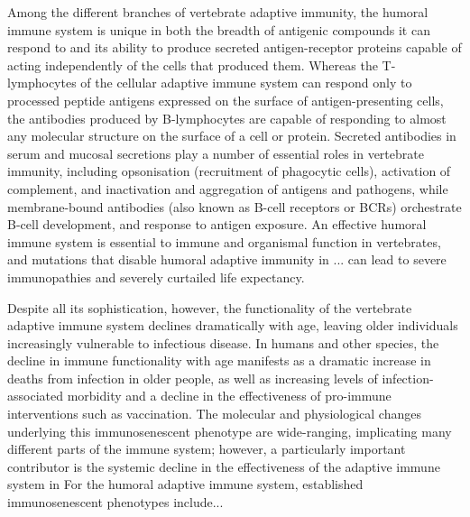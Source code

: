 Among the different branches of vertebrate adaptive immunity, the humoral immune system is unique in both the breadth of antigenic compounds it can respond to and its ability to produce secreted antigen-receptor proteins capable of acting independently of the cells that produced them. Whereas the T-lymphocytes of the cellular adaptive immune system can respond only to processed peptide antigens expressed on the surface of antigen-presenting cells, the antibodies produced by B-lymphocytes are capable of responding to almost any molecular structure on the surface of a cell or protein. Secreted antibodies in serum and mucosal secretions play a number of essential roles in vertebrate immunity, including opsonisation (recruitment of phagocytic cells), activation of complement, and inactivation and aggregation of antigens and pathogens, while membrane-bound antibodies (also known as B-cell receptors or BCRs) orchestrate B-cell development, and response to antigen exposure. An effective humoral immune system is essential to immune and organismal function in vertebrates, and mutations that disable humoral adaptive immunity in ...%
can lead to severe immunopathies and severely curtailed life expectancy. %


Despite all its sophistication, however, the functionality of the vertebrate adaptive immune system declines dramatically with age, leaving older individuals increasingly vulnerable to infectious disease. In humans and other species, the decline in immune functionality with age manifests as a dramatic increase in deaths from infection in older people, as well as increasing levels of infection-associated morbidity and a decline in the effectiveness of pro-immune interventions such as vaccination. The molecular and physiological changes underlying this immunosenescent phenotype are wide-ranging, implicating many different parts of the immune system; however, a particularly important contributor is the systemic decline in the effectiveness of the adaptive immune system in %
For the humoral adaptive immune system, established immunosenescent phenotypes include... %

